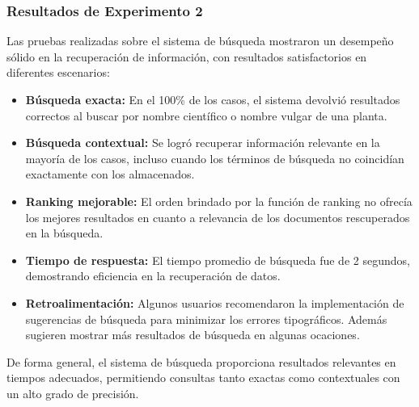 \subsubsection*{Resultados de Experimento 2}
Las pruebas realizadas sobre el sistema de búsqueda mostraron un desempeño sólido en la recuperación de información, con resultados 
satisfactorios en diferentes escenarios:
\begin{itemize}
    \item \textbf{Búsqueda exacta:} En el 100\% de los casos, el sistema devolvió resultados correctos al buscar por nombre científico 
    o nombre vulgar de una planta.
    \item \textbf{Búsqueda contextual:} Se logró recuperar información relevante en la mayoría de los casos, incluso cuando los términos
    de búsqueda no coincidían exactamente con los almacenados.
    \item \textbf{Ranking mejorable:} El orden brindado por la función de ranking no ofrecía los mejores resultados en cuanto a relevancia
    de los documentos rescuperados en la búsqueda.
    \item \textbf{Tiempo de respuesta:} El tiempo promedio de búsqueda fue de 2 segundos, demostrando eficiencia en la recuperación de datos.
    \item \textbf{Retroalimentación:} Algunos usuarios recomendaron la implementación de sugerencias de búsqueda para minimizar los errores 
    tipográficos. Además sugieren mostrar más resultados de búsqueda en algunas ocaciones.
\end{itemize}
De forma general, el sistema de búsqueda proporciona resultados relevantes en tiempos adecuados, permitiendo consultas tanto exactas 
como contextuales con un alto grado de precisión.

